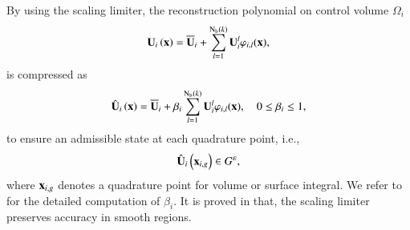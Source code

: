 By using the scaling limiter, the reconstruction polynomial on control volume $\Omega_i$
\begin{equation}
    \mathbf{U}_{i} \left(\mathbf{x}\right) = \overline{\mathbf{U}}_{i} + \sum_{l=1}^{\mathrm{N_b}(k)}{\mathbf{U}_i^l\varphi_{i,l}(\mathbf{x})},
\end{equation}
is compressed as
\begin{equation}
\label{eq:polynomial-scaling}
    \hat{\mathbf{U}}_{i} \left(\mathbf{x}\right) = \overline{\mathbf{U}}_{i} + \beta_i \sum_{l=1}^{\mathrm{N_b}(k)}{\mathbf{U}_i^l\varphi_{i,l}(\mathbf{x})}, \quad 0 \leq \beta_i \leq 1,
\end{equation}
to ensure an admissible state at each quadrature point, i.e.,
\begin{equation}
    \hat{\mathbf{U}}_{i} \left(\mathbf{x}_{i,g}\right) \in G^{\varepsilon},
\end{equation}
where $\mathbf{x}_{i,g}$ denotes a quadrature point for volume or surface integral. We refer to \cite{zhang2010positivity} for the detailed computation of $\beta_i$. 
It is proved in \cite{zhang2010positivity} that, the scaling limiter preserves accuracy in smooth regions.



